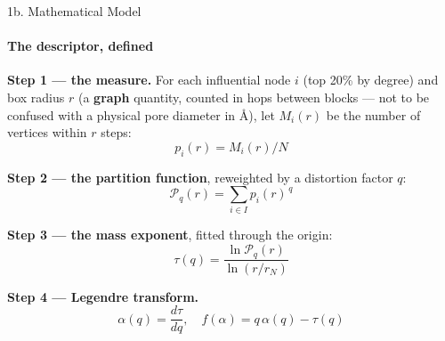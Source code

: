 \documentclass[aspectratio=169, 11pt]{beamer}
\begin{document}
\begin{frame}{1b. Mathematical Model}
\framesubtitle{The descriptor, defined}
\vspace{0.2cm}
\begin{center}
\begin{minipage}{0.62\textwidth}
\small
\textbf{Step 1 --- the measure.} For each influential node $i$ (top 20\% by degree) and box
radius $r$ (a \textbf{graph} quantity, counted in hops between blocks --- not to be confused
with a physical pore diameter in \AA), let $M_i(r)$ be the number of vertices within $r$
steps:
\vspace{-0.1cm}
\[ p_i(r) = M_i(r)/N \]

\textbf{Step 2 --- the partition function}, reweighted by a distortion factor $q$:
\vspace{-0.1cm}
\[ \mathcal{P}_q(r) = \sum_{i \in I} p_i(r)^{\,q} \]

\textbf{Step 3 --- the mass exponent}, fitted through the origin:
\vspace{-0.1cm}
\[ \boxed{\ \tau(q) = \frac{\ln \mathcal{P}_q(r)}{\ln (r/r_N)}\ } \]

\textbf{Step 4 --- Legendre transform.}
\vspace{-0.1cm}
\[ \alpha(q) = \frac{d\tau}{dq}, \quad f(\alpha) = q\,\alpha(q) - \tau(q) \]
\end{minipage}
\end{center}
\end{frame}

\end{document}
